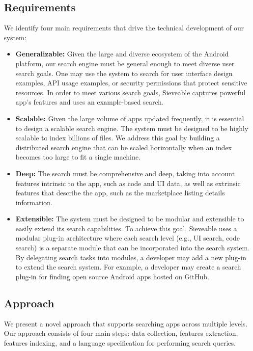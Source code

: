\subsection{Requirements}
We identify four main requirements that drive the technical development of our system:
\begin{itemize}
	\item \textbf{Generalizable:}
	Given the large and diverse ecosystem of the Android platform, our search engine must be general enough to meet diverse user search goals.
	One may use the system to search for user interface design examples, API usage examples, or security permissions that protect sensitive resources.
	In order to meet various search goals, Sieveable captures powerful app's features and uses an example-based search.
	
	\item \textbf{Scalable:}
	Given the large volume of apps updated frequently, it is essential to design a scalable search engine.
	The system must be designed to be highly scalable to index billions of files. We address this goal by building a distributed search engine that can be scaled horizontally when an index becomes too large to fit a single machine.
	\item \textbf{Deep:}
	The search must be comprehensive and deep, taking into account features intrinsic to the app, such as code and UI data, as well as extrinsic features that describe the app, such as the marketplace listing details information.
	
	\item \textbf{Extensible:}
	The system must be designed to be modular and extensible to easily extend its search capabilities.
	To achieve this goal, Sieveable uses a modular plug-in architecture where each search level (e.g., UI search, code search) is a separate module that can be incorporated into the search system.
	By delegating search tasks into modules, a developer may add a new plug-in to extend the search system.
	For example, a developer may create a search plug-in for finding open source Android apps hosted on GitHub.
\end{itemize}

\subsection{Approach}
We present a novel approach that supports searching apps across multiple levels.
Our approach consists of four main steps: data collection, features extraction, features indexing, and a language specification for performing search queries.

